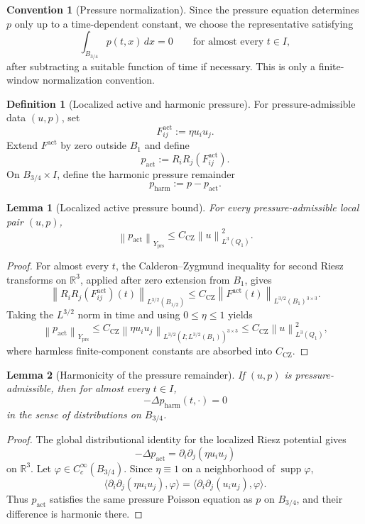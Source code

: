 \documentclass[11pt]{article}
\numberwithin{equation}{section}
\newtheorem{lemma}[lemma]{Lemma}
\theoremstyle{definition}
\newtheorem{definition}[definition]{Definition}
\newtheorem{convention}[convention]{Convention}
\theoremstyle{remark}
\DeclareMathOperator{\supp}{supp}
\newcommand{\R}{\mathbb{R}}
\newcommand{\prs}{\mathrm{prs}}
\newcommand{\harm}{\mathrm{harm}}
\newcommand{\act}{\mathrm{act}}
\newcommand{\CZ}{\mathrm{CZ}}
\newcommand{\norm}[2]{\left\|#1\right\|_{#2}}
\begin{document}
\begin{convention}[Pressure normalization]\label{conv:pressure-normalization}
Since the pressure equation determines $p$ only up to a time-dependent constant, we choose
the representative satisfying
\[
        \int_{B_{3/4}}p(t,x)\,dx=0
        \qquad\text{for almost every }t\in I,
\]
after subtracting a suitable function of time if necessary.  This is only a finite-window
normalization convention.
\end{convention}

\begin{definition}[Localized active and harmonic pressure]\label{def:active-harmonic-pressure}
For pressure-admissible data $(u,p)$, set
\[
        F^{\act}_{ij}:=\eta u_i u_j.
\]
Extend $F^{\act}$ by zero outside $B_1$ and define
\[
        p_{\act}:=R_iR_j(F^{\act}_{ij}).
\]
On $B_{3/4}\times I$, define the harmonic pressure remainder
\[
        p_{\harm}:=p-p_{\act}.
\]
\end{definition}

\begin{lemma}[Localized active pressure bound]\label{lem:active-pressure-bound}
For every pressure-admissible local pair $(u,p)$,
\[
        \norm{p_{\act}}{Y_{\prs}}
        \le
        C_{\CZ}\norm{u}{L^3(Q_1)}^2.
\]
\end{lemma}

\begin{proof}
For almost every $t$, the Calderon--Zygmund inequality for second Riesz transforms on
$\R^3$, applied after zero extension from $B_1$, gives
\[
\norm{R_iR_j(F^{\act}_{ij})(t)}{L^{3/2}(B_{1/2})}
\le
C_{\CZ}\norm{F^{\act}(t)}{L^{3/2}(B_1)^{3\times3}}.
\]
Taking the $L^{3/2}$ norm in time and using $0\le\eta\le1$ yields
\[
\norm{p_{\act}}{Y_{\prs}}
\le
C_{\CZ}\norm{\eta u_i u_j}{L^{3/2}(I;L^{3/2}(B_1))^{3\times3}}
\le
C_{\CZ}\norm{u}{L^3(Q_1)}^2,
\]
where harmless finite-component constants are absorbed into $C_{\CZ}$.
\end{proof}

\begin{lemma}[Harmonicity of the pressure remainder]\label{lem:harmonic-remainder}
If $(u,p)$ is pressure-admissible, then for almost every $t\in I$,
\[
        -\Delta p_{\harm}(t,\cdot)=0
\]
in the sense of distributions on $B_{3/4}$.
\end{lemma}

\begin{proof}
The global distributional identity for the localized Riesz potential gives
\[
        -\Delta p_{\act}=\partial_i\partial_j(\eta u_i u_j)
\]
on $\R^3$.  Let $\varphi\in C_c^\infty(B_{3/4})$.  Since $\eta\equiv1$ on a neighborhood
of $\supp\varphi$,
\[
\langle \partial_i\partial_j(\eta u_i u_j),\varphi\rangle
=
\langle \partial_i\partial_j(u_i u_j),\varphi\rangle.
\]
Thus $p_{\act}$ satisfies the same pressure Poisson equation as $p$ on $B_{3/4}$, and their
difference is harmonic there.
\end{proof}
\end{document}

